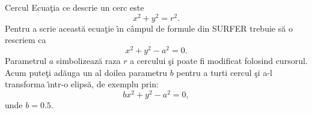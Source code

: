\begin{surferPage}[Cercul]{Cercul}
Ecua\c tia ce descrie un cerc este
\[x^2+y^2=r^2.\]
Pentru a scrie aceast\u a ecua\c tie \^\i n c\^ampul de formule din SURFER trebuie s\u a o rescriem ca
\[x^2+y^2-a^2=0.\]
Parametrul $a$ simbolizeaz\u a raza $r$ a cercului \c si poate fi modificat folosind cursorul. Acum pute\c ti ad\u auga un al doilea parametru $b$ pentru a turti cercul \c si a-l transforma \^\i ntr-o elips\u a, de exemplu prin:
\[bx^2+y^2-a^2=0,\] unde $b=0.5$.
\end{surferPage}
